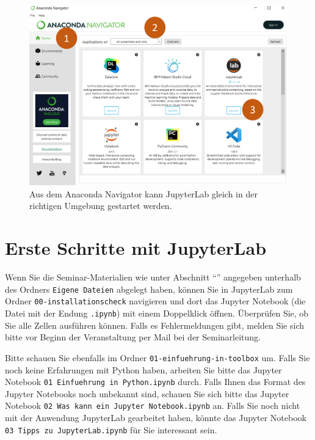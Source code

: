 \documentclass{tufte-handout}
\begin{document}
\begin{figure}[h]
  \includegraphics{anaconda-navigator-jupyterlab--mit-reihenfolge}
  \caption{Aus dem Anaconda Navigator kann JupyterLab gleich in der richtigen Umgebung gestartet werden.}%
\label{fig:start-jupyterlab}
\end{figure}

\section{Erste Schritte mit JupyterLab}

Wenn Sie die Seminar-Materialien wie unter Abschnitt \enquote{} angegeben unterhalb des Ordners \texttt{Eigene Dateien} abgelegt haben, 
können Sie in JupyterLab zum Ordner 
\texttt{00-installationscheck}
navigieren und dort das Jupyter Notebook (die Datei mit der Endung \texttt{.ipynb}) mit einem Doppelklick öffnen.
Überprüfen Sie, ob Sie alle Zellen ausführen können.
Falls es Fehlermeldungen gibt, melden Sie sich bitte vor Beginn der Veranstaltung per Mail bei der Seminarleitung.

Bitte schauen Sie ebenfalls im Ordner
\texttt{01-einfuehrung-in-toolbox}
um.
Falls Sie noch keine Erfahrungen mit Python haben, arbeiten Sie bitte das Jupyter Notebook
\texttt{01 Einfuehrung in Python.ipynb}
durch.
Falls Ihnen das Format des Jupyter Notebooks noch unbekannt sind, schauen Sie sich bitte das Jupyter Notebook
\texttt{02 Was kann ein Jupyter Notebook.ipynb}
an.
Falls Sie noch nicht mit der Anwendung JupyterLab gearbeitet haben, könnte das Jupyter Notebook \texttt{03 Tipps zu JupyterLab.ipynb} für Sie interessant sein.
\end{document}
